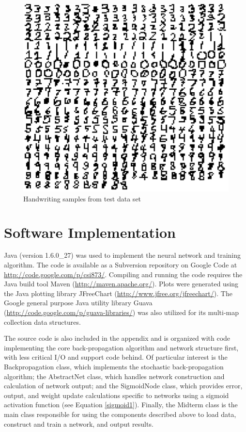 \documentclass{article}
\begin{document}
\begin{figure}
\centering
\includegraphics[width=1.00\textwidth]{data/visualization/all_testing_data.png}
\caption{Handwriting samples from test data set}
\label{test_all}
\end{figure}

\section{Software Implementation}\label{Software Implementation}

Java (version 1.6.0\_27) was used to implement the neural network and training algorithm. The code is available as a Subversion repository on Google Code at \url{http://code.google.com/p/csi873/}. Compiling and running the code requires the Java build tool Maven (\url{http://maven.apache.org/}). Plots were generated using the Java plotting library JFreeChart (\url{http://www.jfree.org/jfreechart/}). The Google general purpose Java utility library Guava (\url{http://code.google.com/p/guava-libraries/}) was also utilized for its multi-map collection data structures.

The source code is also included in the appendix and is organized with code implementing the core back-propagation algorithm and network structure first, with less critical I/O and support code behind. Of particular interest is the Backpropagation class, which implements the stochastic back-propagation algorithm; the AbstractNet class, which handles network construction and calculation of network output; and the SigmoidNode class, which provides error, output, and weight update calculations specific to networks using a sigmoid activation function (see Equation \ref{sigmoid1}). Finally, the Midterm class is the main class responsible for using the components described above to load data, construct and train a network, and output results.
\end{document}
